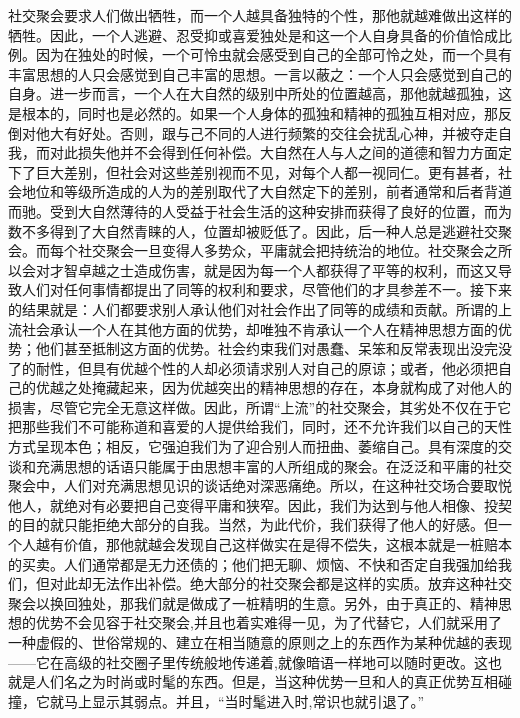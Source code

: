 \documentclass[11pt,oneside]{article}
\begin{document}
\begin{common-format}
社交聚会要求人们做出牺牲，而一个人越具备独特的个性，那他就越难做出这样的牺牲。因此，一个人逃避、忍受抑或喜爱独处是和这一个人自身具备的价值恰成比例。因为在独处的时候，一个可怜虫就会感受到自己的全部可怜之处，而一个具有丰富思想的人只会感觉到自己丰富的思想。一言以蔽之：一个人只会感觉到自己的自身。进一步而言，一个人在大自然的级别中所处的位置越高，那他就越孤独，这是根本的，同时也是必然的。如果一个人身体的孤独和精神的孤独互相对应，那反倒对他大有好处。否则，跟与己不同的人进行频繁的交往会扰乱心神，并被夺走自我，而对此损失他并不会得到任何补偿。大自然在人与人之间的道德和智力方面定下了巨大差别，但社会对这些差别视而不见，对每个人都一视同仁。更有甚者，社会地位和等级所造成的人为的差别取代了大自然定下的差别，前者通常和后者背道而驰。受到大自然薄待的人受益于社会生活的这种安排而获得了良好的位置，而为数不多得到了大自然青睐的人，位置却被贬低了。因此，后一种人总是逃避社交聚会。而每个社交聚会一旦变得人多势众，平庸就会把持统治的地位。社交聚会之所以会对才智卓越之士造成伤害，就是因为每一个人都获得了平等的权利，而这又导致人们对任何事情都提出了同等的权利和要求，尽管他们的才具参差不一。接下来的结果就是：人们都要求别人承认他们对社会作出了同等的成绩和贡献。所谓的上流社会承认一个人在其他方面的优势，却唯独不肯承认一个人在精神思想方面的优势；他们甚至抵制这方面的优势。社会约束我们对愚蠢、呆笨和反常表现出没完没了的耐性，但具有优越个性的人却必须请求别人对自己的原谅；或者，他必须把自己的优越之处掩藏起来，因为优越突出的精神思想的存在，本身就构成了对他人的损害，尽管它完全无意这样做。因此，所谓“上流”的社交聚会，其劣处不仅在于它把那些我们不可能称道和喜爱的人提供给我们，同时，还不允许我们以自己的天性方式呈现本色；相反，它强迫我们为了迎合别人而扭曲、萎缩自己。具有深度的交谈和充满思想的话语只能属于由思想丰富的人所组成的聚会。在泛泛和平庸的社交聚会中，人们对充满思想见识的谈话绝对深恶痛绝。所以，在这种社交场合要取悦他人，就绝对有必要把自己变得平庸和狭窄。因此，我们为达到与他人相像、投契的目的就只能拒绝大部分的自我。当然，为此代价，我们获得了他人的好感。但一个人越有价值，那他就越会发现自己这样做实在是得不偿失，这根本就是一桩赔本的买卖。人们通常都是无力还债的；他们把无聊、烦恼、不快和否定自我强加给我们，但对此却无法作出补偿。绝大部分的社交聚会都是这样的实质。放弃这种社交聚会以换回独处，那我们就是做成了一桩精明的生意。另外，由于真正的、精神思想的优势不会见容于社交聚会,并且也着实难得一见，为了代替它，人们就采用了一种虚假的、世俗常规的、建立在相当随意的原则之上的东西作为某种优越的表现——它在高级的社交圈子里传统般地传递着,就像暗语一样地可以随时更改。这也就是人们名之为时尚或时髦的东西。但是，当这种优势一旦和人的真正优势互相碰撞，它就马上显示其弱点。并且，“当时髦进入时,常识也就引退了。” 


\end{common-format}
\end{document}
